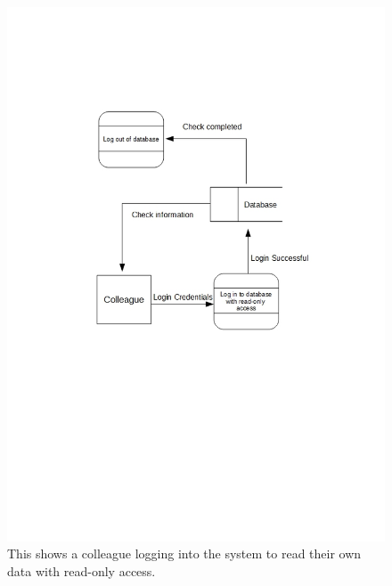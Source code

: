 \begin{figure}[H]
\includegraphics[width=\textwidth]{DFDLoginColleague.jpg}
\caption{This shows a colleague logging into the system to read their own data with read-only access. } \label{Page1Interview}
\end{figure}


